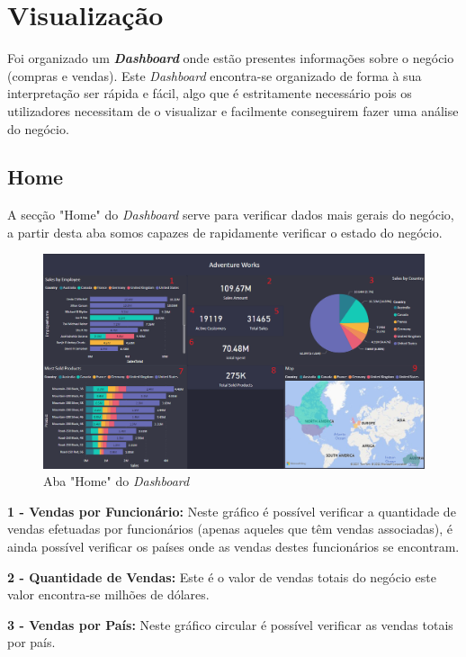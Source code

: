 \section*{Visualização}

Foi organizado um \textit{\textbf{Dashboard}} onde estão presentes informações sobre o negócio (compras e vendas). Este \textit{Dashboard} encontra-se organizado de forma à sua interpretação ser rápida e fácil, algo que é estritamente necessário pois os utilizadores necessitam de o visualizar e facilmente conseguirem fazer uma análise do negócio.

\subsection{Home}

A secção "Home" do \textit{Dashboard} serve para verificar dados mais gerais do negócio, a partir desta aba somos capazes de rapidamente verificar o estado do negócio.

\begin{figure}[H]
    \centering
    \includegraphics[scale=0.4]{images/Home.png}
    \caption{Aba "Home" do \textit{Dashboard}}
\end{figure}

\textbf{1 - Vendas por Funcionário:} Neste gráfico é possível verificar a quantidade de vendas efetuadas por funcionários (apenas aqueles que têm vendas associadas), é ainda possível verificar os países onde as vendas destes funcionários se encontram.

\textbf{2 - Quantidade de Vendas:} Este é o valor de vendas totais do negócio este valor encontra-se milhões de dólares.

\textbf{3 - Vendas por País:} Neste gráfico circular é possível verificar as vendas totais por país.

